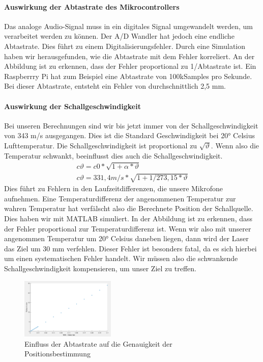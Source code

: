 \paragraph{Auswirkung der Abtastrate des Mikrocontrollers}
Das analoge Audio-Signal muss in ein digitales Signal umgewandelt werden, um verarbeitet werden zu können. Der A/D Wandler hat jedoch eine endliche Abtastrate. Dies führt zu einem Digitalisierungsfehler. Durch eine Simulation haben wir herausgefunden, wie die Abtastrate mit dem Fehler korreliert. An der Abbildung ist zu erkennen, dass der Fehler proportional zu 1/Abtastrate ist. Ein Raspberrry Pi hat zum Beispiel eine Abtastrate von 100kSamples pro Sekunde. Bei dieser Abtastrate, entsteht ein Fehler von durchschnittlich 2,5 mm.

\paragraph{Auswirkung der Schallgeschwindigkeit}
Bei unseren Berechnungen sind wir bis jetzt immer von der Schallgeschwindigkeit von 343 m/s ausgegangen. Dies ist die Standard Geschwindigkeit bei 20° Celsius Lufttemperatur. Die Schallgeschwindigkeit ist proportional zu $\sqrt{\vartheta}$. Wenn also die Temperatur schwankt, beeinflusst dies auch die Schallgeschwindigkeit. 
\begin{align}
c\vartheta = c0 * \sqrt{1+\alpha * \vartheta}\\   
c\vartheta =  331,4 m/s * \sqrt{1 + 1/273,15 * \vartheta}
\end{align}
Dies führt zu Fehlern in den Laufzeitdifferenzen, die unsere Mikrofone aufnehmen. Eine Temperaturdifferenz der angenommenen Temperatur zur wahren Temperatur hat verfälscht also die Berechnete Position der Schallquelle. Dies haben wir mit MATLAB simuliert. In der Abbildung ist zu erkennen, dass der Fehler proportional zur Temperaturdifferenz ist. Wenn wir also mit unserer angenommen Temperatur um 20° Celsius daneben liegen, dann wird der Laser das Ziel um 30 mm verfehlen. Dieser Fehler ist besonders fatal, da es sich hierbei um einen systematischen Fehler handelt. Wir müssen also die schwankende Schallgeschwindigkeit kompensieren, um unser Ziel zu treffen.

\begin{figure}
\centering 
\includegraphics[width=0.4\textwidth]{Chart Abtastrate}
\caption{Einfluss der Abtastrate auf die Genauigkeit der Positionsbestimmung}\label{fig:Einfluss der Abtastrate auf die Genauigkeit der Positionsbestimmung}
\end{figure}

